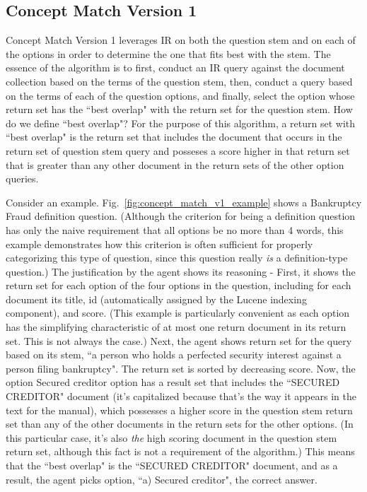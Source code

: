 \subsection{Concept Match Version 1}

Concept Match Version 1 leverages IR on both the question stem and on each of the options in order to determine the one that fits best with the stem.  The essence of the algorithm is to first, conduct an IR query against the document collection based on the terms of the question stem, then, conduct a query based on the terms of each of the question options, and finally, select the option whose return set has the ``best overlap" with the return set for the question stem.  How do we define ``best overlap"?  For the purpose of this algorithm, a return set with ``best overlap" is the return set that includes the document that occurs in the return set of question stem query and posseses a score higher in that return set that is greater than any other document in the return sets of the other option queries.

Consider an example.  Fig.~\ref{fig:concept_match_v1_example} shows a Bankruptcy Fraud definition question.  (Although the criterion for being a definition question has only the naive requirement that all options be no more than 4 words, this example demonstrates how this criterion is often sufficient for properly categorizing this type of question, since this question really \emph{is} a definition-type question.)  The justification by the agent shows its reasoning - First, it shows the return set for each option of the four options in the question, including for each document its title, id (automatically assigned by the Lucene indexing component), and score.  (This example is particularly convenient as each option has the simplifying characteristic of at most one return document in its return set.  This is not always the case.)  Next, the agent shows return set for the query based on its stem, ``a person who holds a perfected security interest against a person filing bankruptcy".  The return set is sorted by decreasing score.  Now, the option Secured creditor option has a result set that includes the ``SECURED CREDITOR" document (it's capitalized because that's the way it appears in the text for the manual), which possesses a higher score in the question stem return set than any of the other documents in the return sets for the other options.  (In this particular case, it's also \emph{the} high scoring document in the question stem return set, although this fact is not a requirement of the algorithm.)  This means that the ``best overlap" is the ``SECURED CREDITOR" document, and as a result, the agent picks option, ``a) Secured creditor", the correct answer.

